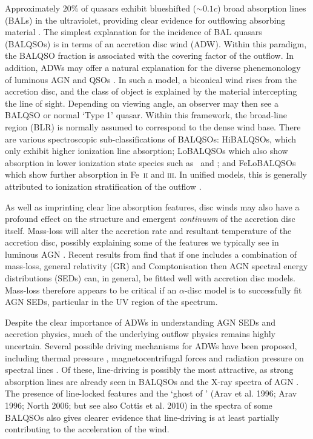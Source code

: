 \documentclass[useAMS,usenatbib]{mn2e_x}
\begin{document}
Approximately $20\%$ of quasars exhibit blueshifted ($\sim 0.1c$)
broad absorption lines (BALs) in the ultraviolet,
providing clear evidence for outflowing absorbing material
\citep{weymann1991, reichard2003, knigge2008, turnermiller2009, allen2011}.
The simplest explanation for the incidence of 
BAL quasars (BALQSOs) is in terms of an accretion disc wind (ADW). 
Within this paradigm, the BALQSO fraction is associated with
the covering factor of the outflow.
In addition, ADWs may offer a natural explanation for the
diverse phenemonology of luminous AGN and QSOs \citep[e.g.][]{MCGV95, elvis2000}. 
In such a model, a biconical wind rises from 
the accretion disc, and the class of object is explained by the material
intercepting the line of sight. Depending on viewing angle, an observer 
may then see a BALQSO or normal `Type 1' quasar.
Within this framework, the broad-line region (BLR) is normally
assumed to correspond to the dense wind base.
There are various spectroscopic sub-classifications of BALQSOs: 
HiBALQSOs, which only exhibit higher
ionization line absorption; LoBALQSOs which also show
absorption in lower ionization state species such as \mg\ and \al; and
FeLoBALQSOs which show further absorption in Fe~\textsc{ii} and \textsc{iii}.
In unified models, this is generally attributed to ionization stratification
of the outflow \citep[e.g.][]{elvis2000}.

As well as imprinting clear line absorption features,
disc winds may also have a profound effect on the structure and 
emergent {\em continuum} of the accretion disc itself.
Mass-loss will alter the accretion rate and resultant 
temperature of the accretion disc, possibly explaining some 
of the features we typically see in luminous AGN \citep{laordavis2014}.
Recent results from \cite{capellupo2015} find 
that if one includes a combination of mass-loss, general relativity (GR) and Comptonisation
then AGN spectral energy distributions (SEDs) can, in general, be fitted well with accretion disc models.
Mass-loss therefore appears to be critical if an $\alpha$-disc
model is to successfully fit AGN SEDs, particular in the UV region of the spectrum.

Despite the clear importance of ADWs in understanding AGN SEDs and accretion physics, 
much of the underlying outflow physics remains highly uncertain. 
Several possible driving mechanisms for ADWs have been proposed, including
thermal pressure \citep{weymann1982, begelman1991}, magnetocentrifugal forces 
\citep{blandfordpayne,pelletier_pudritz} and 
radiation pressure on spectral lines \citep[`line-driving';][]{lucysolomon1970,shlosman1985,MCGV95}.
Of these, line-driving is possibly the most attractive, as
strong absorption lines are already seen in BALQSOs and the X-ray spectra of AGN 
\citep{reeves2003,poundsreeves2009,tombesi2010a}.
The presence of line-locked features \citep{bowler2014} 
and the `ghost of \la' (Arav et al. 1996; Arav 1996; North 2006; but see 
also Cottis et al. 2010) \nocite{arav1995, arav1996, north2006,cottis2010}
in the spectra of some BALQSOs also gives clearer evidence that line-driving is
at least partially contributing to the acceleration of the wind.
\end{document}
